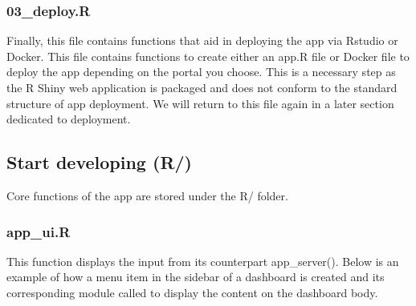 \documentclass[]{article}
\begin{document}
\hypertarget{deploy.r}{%
\subsubsection{03\_deploy.R}\label{deploy.r}}

Finally, this file contains functions that aid in deploying the app via
Rstudio or Docker. This file contains functions to create either an
app.R file or Docker file to deploy the app depending on the portal you
choose. This is a necessary step as the R Shiny web application is
packaged and does not conform to the standard structure of app
deployment. We will return to this file again in a later section
dedicated to deployment.

\hypertarget{start-developing-r}{%
\subsection{\texorpdfstring{\textbf{Start developing}
(R/)}{Start developing (R/)}}\label{start-developing-r}}

Core functions of the app are stored under the R/ folder.

\hypertarget{app_ui.r}{%
\subsubsection{app\_ui.R}\label{app_ui.r}}

This function displays the input from its counterpart app\_server().
Below is an example of how a menu item in the sidebar of a dashboard is
created and its corresponding module called to display the content on
the dashboard body.
\end{document}
